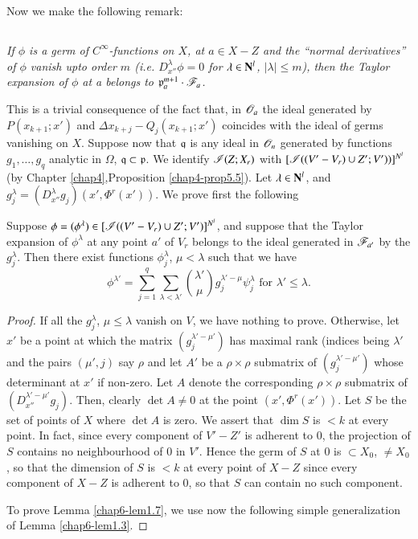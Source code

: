 Now we make the following remark:

\setcounter{subsection}{5}
\subsection{}\label{chap6-sec1.6}
{\em If $\phi$ is a germ of $C^{\infty}$-functions on $X$, at $a\in X-Z$ and the ``normal derivatives'' of $\phi$ vanish upto order $m$ (i.e. $D^{\lambda}_{x''}\phi=0$ for $\lambda\in \mathbf{N}^{l}$, $|\lambda|\leq m$), then the Taylor expansion of $\phi$ at a belongs to $\mathfrak{p}^{m+1}_{a}\cdot \mathscr{F}_{a}$.}

This is a trivial consequence of the fact that, in $\mathscr{O}_{a}$ the ideal generated by $P(x_{k+1};x')$ and $\Delta x_{k+j}-Q_{j}(x_{k+1};x')$ coincides with the ideal of germs vanishing on $X$. Suppose now that $\mathfrak{q}$ is any ideal in $\mathscr{O}_{n}$ generated by functions $g_{1},\ldots,g_{q}$ analytic in $\Omega$, $\mathfrak{q}\subset \mathfrak{p}$. We identify $\mathscr{I}(Z;X_{r})$ with $[\mathscr{I}((V'-V_{r})\cup Z';V'))]^{N^{l}}$ (by Chapter \ref{chap4},\pageoriginale Proposition \ref{chap4-prop5.5}). Let $\lambda\in \mathbf{N}^{l}$, and $g^{\lambda}_{j}=(D^{\lambda}_{x''}g_{j})(x',\Phi^{r}(x'))$. We prove first the following

\setcounter{theorem}{6}
\begin{lemma}\label{chap6-lem1.7}
Suppose $\phi=(\phi^{\lambda})\in[\mathscr{I}((V'-V_{r})\cup Z';V')]^{N^{l}}$, and suppose that the Taylor expansion of $\phi^{\lambda}$ at any point $a'$ of $V_{r}$ belongs to the ideal generated in $\mathscr{F}_{a'}$ by the $g^{\lambda}_{j}$. Then there exist functions $\phi^{\lambda}_{j}$, $\mu<\lambda$ such that we have
$$
\phi^{\lambda'}=\sum\limits^{q}_{j=1}\sum\limits_{\lambda<\lambda'}\binom{\lambda'}{\mu}g^{\lambda'-\mu}_{j}\psi^{\lambda}_{j}\text{ for } \lambda'\leq \lambda.
$$
\end{lemma}

\begin{proof}
If all the $g^{\lambda}_{j}$, $\mu\leq \lambda$ vanish on $V$, we have nothing to prove. Otherwise, let $x'$ be a point at which the matrix $(g^{\lambda'-\mu'}_{j})$ has maximal rank (indices being $\lambda'$ and the pairs $(\mu',j)$ say $\rho$ and let $A'$ be a $\rho\times \rho$ submatrix of $(g^{\lambda'-\mu'}_{j})$ whose determinant at $x'$ if non-zero. Let $A$ denote the corresponding $\rho\times\rho$ submatrix of $(D^{\lambda'-\mu'}_{x''}g_{j})$. Then, clearly $\det A\neq 0$ at the point $(x',\Phi^{r}(x'))$. Let $S$ be the set of points of $X$ where $\det A$ is zero. We assert that $\dim S$ is $< k$ at every point. In fact, since every component of $V'-Z'$ is adherent to $0$, the projection of $S$ contains no neighbourhood of $0$ in $V'$. Hence the germ of $S$ at $0$ is $\subset X_{0}$, $\neq X_{0}$, so that the dimension of $S$ is $<k$ at every point of $X-Z$ since every component of $X-Z$ is adherent to $0$, so that $S$ can contain no such component.

To prove Lemma \ref{chap6-lem1.7}, we use now the following simple generalization of Lemma \ref{chap6-lem1.3}.
\end{proof}

